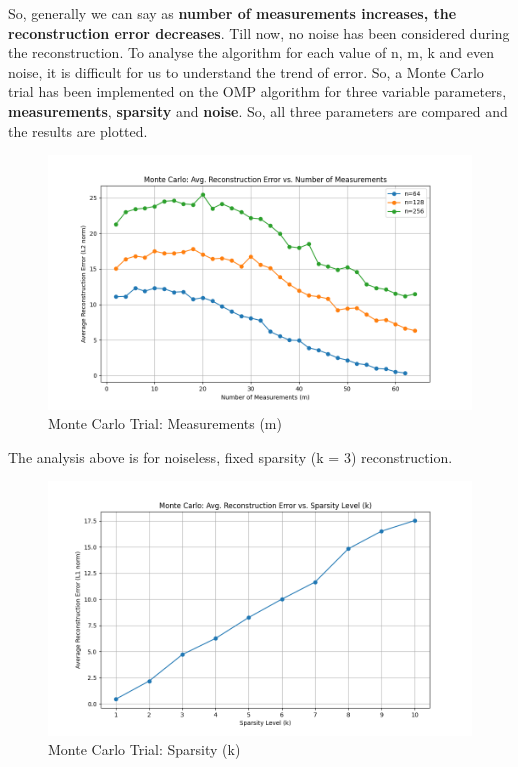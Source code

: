 \documentclass[
  letterpaper,
  DIV=11,
  numbers=noendperiod]{scrartcl}
\begin{document}
So, generally we can say as \textbf{number of measurements increases,
the reconstruction error decreases}. Till now, no noise has been
considered during the reconstruction. To analyse the algorithm for each
value of n, m, k and even noise, it is difficult for us to understand
the trend of error. So, a Monte Carlo trial has been implemented on the
OMP algorithm for three variable parameters, \textbf{measurements},
\textbf{sparsity} and \textbf{noise}. So, all three parameters are
compared and the results are plotted.

\begin{figure}[H]

{\centering \includegraphics[width=0.8\linewidth,height=\textheight,keepaspectratio]{abar-cs_files/mediabag/omp-montecarlo-sum.png}

}

\caption{Monte Carlo Trial: Measurements (m)}

\end{figure}%

The analysis above is for noiseless, fixed sparsity (k = 3)
reconstruction.

\begin{figure}[H]

{\centering \includegraphics[width=0.8\linewidth,height=\textheight,keepaspectratio]{abar-cs_files/mediabag/omp-montecarlo-spars.png}

}

\caption{Monte Carlo Trial: Sparsity (k)}

\end{figure}%
\end{document}

